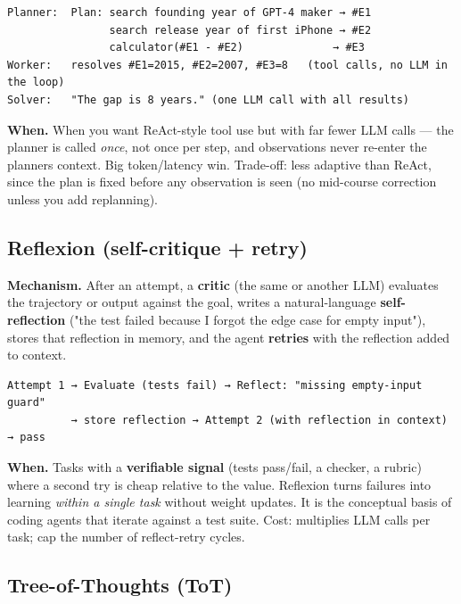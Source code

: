 \documentclass[11pt]{article}
\begin{document}
\setcodelang{}

\begin{verbatim}
Planner:  Plan: search founding year of GPT-4 maker → #E1
                search release year of first iPhone → #E2
                calculator(#E1 - #E2)              → #E3
Worker:   resolves #E1=2015, #E2=2007, #E3=8   (tool calls, no LLM in the loop)
Solver:   "The gap is 8 years." (one LLM call with all results)
\end{verbatim}

\textbf{When.} When you want ReAct-style tool use but with far fewer LLM calls --- the planner is called \emph{once}, not once per step, and observations never re-enter the planner\textquotesingle s context. Big token/latency win. Trade-off: less adaptive than ReAct, since the plan is fixed before any observation is seen (no mid-course correction unless you add replanning).

\subsection{Reflexion (self-critique + retry)}\label{reflexion-self-critique--retry}

\textbf{Mechanism.} After an attempt, a \textbf{critic} (the same or another LLM) evaluates the trajectory or output against the goal, writes a natural-language \textbf{self-reflection} ("the test failed because I forgot the edge case for empty input"), stores that reflection in memory, and the agent \textbf{retries} with the reflection added to context.

\setcodelang{}

\begin{verbatim}
Attempt 1 → Evaluate (tests fail) → Reflect: "missing empty-input guard"
          → store reflection → Attempt 2 (with reflection in context) → pass
\end{verbatim}

\textbf{When.} Tasks with a \textbf{verifiable signal} (tests pass/fail, a checker, a rubric) where a second try is cheap relative to the value. Reflexion turns failures into learning \emph{within a single task} without weight updates. It is the conceptual basis of coding agents that iterate against a test suite. Cost: multiplies LLM calls per task; cap the number of reflect-retry cycles.

\subsection{Tree-of-Thoughts (ToT)}\label{tree-of-thoughts-tot}
\end{document}
